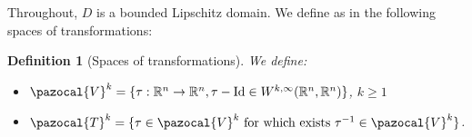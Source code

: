 \documentclass[english,a4paper,10pt,oneside]{scrbook}	%
\theoremstyle{break}
\newtheorem{defn}[equation]{Definition}
\theoremstyle{remark}
\newcommand{\mR}{\mathbb{R}}
\newcommand{\cV}{\pazocal{V}}
\newcommand{\cT}{\pazocal{T}}
\newcommand{\id}{\text{Id}}
\begin{document}
\begin{appendices}
Throughout, $D$ is a bounded Lipschitz domain. We define as in \cite{murat} the following spaces of transformations:

\begin{defn}[Spaces of transformations]
\label{defn:spaces_trans}
We define:
\begin{itemize}	
	\item $\cV^k=\{\tau: \mR^n \rightarrow \mR^n, \tau-\id \in W^{k,\infty}(\mR^n,\mR^n)\}$, $k\geq 1$
	\item $\cT^k=\{\tau \in \cV^k \text{ for which exists } \tau^{-1} \in \cV^k\}$.
\end{itemize} 
\end{defn}


\end{appendices}
\end{document}
